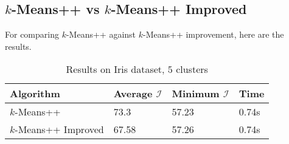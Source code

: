 \documentclass[twoside, 11pt]{article}
\newcommand{\I}{\mathcal{I}}
\begin{document}
	\subsection{$k$-Means++ vs $k$-Means++ Improved}
	For comparing $k$-Means++ against $k$-Means++ improvement, here are the results.
		\begin{table}[h]
			\begin{center}
				\begin{tabular}{|l|l|l|l|}
					\hline
					Algorithm & Average $\I$& Minimum $\I$& Time\\\hline
					$k$-Means++ & 73.3& 57.23& 0.74s\\\hline
					$k$-Means++ Improved& 67.58& 57.26& 0.74s\\\hline
				\end{tabular}
				\caption{Results on Iris dataset, $5$ clusters}
			\end{center}
			\label{tbl:iris2}
		\end{table}
	
\end{document}
